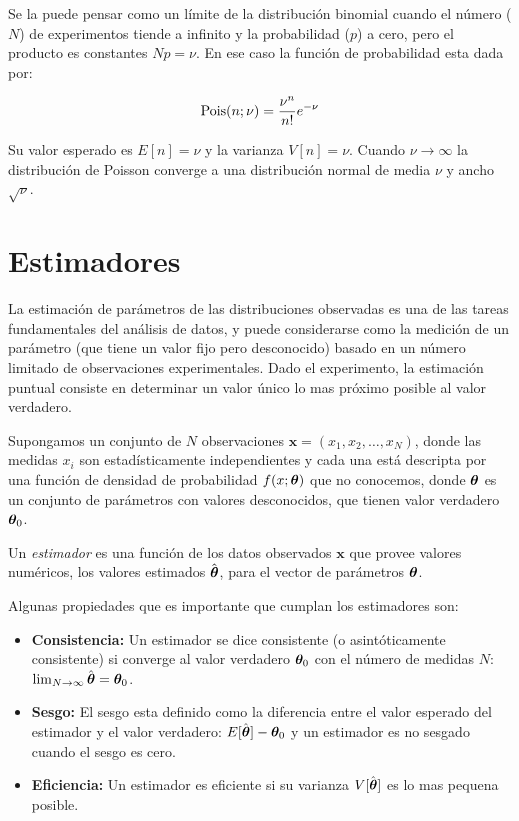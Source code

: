 Se la puede pensar como un límite de la distribución binomial cuando el número ($N$)
de experimentos tiende a infinito y la probabilidad ($p$) a cero, pero el producto es
constantes $Np = \nu$. En ese caso la función de probabilidad esta dada por:

\begin{equation}
  \operatorname{Pois}(n;\nu) = \frac{\nu^n}{n!} e^{-\nu}
\end{equation}

Su valor esperado es $E[n] = \nu$ y la varianza $V[n] = \nu$.
Cuando $\nu \to \infty$ la distribución de Poisson converge a una distribución
normal de media $\nu$ y ancho $\sqrt{\nu}$.


\section{Estimadores}

La estimación de parámetros de las distribuciones observadas es una de las
tareas fundamentales del análisis de datos, y puede considerarse como la
medición de un parámetro (que tiene un valor fijo pero desconocido) basado en un
número limitado de observaciones experimentales. Dado el experimento, la
estimación puntual consiste en determinar un valor único lo mas próximo posible al
valor verdadero.

Supongamos un conjunto de $N$ observaciones $\bm{x} = (x_1, x_2, \ldots, x_N)$,
donde las medidas $x_i$ son estadísticamente independientes y cada una está
descripta por una función de densidad de probabilidad $f(x;\bm{\theta})$ que no
conocemos, donde $\bm{\theta}$ es un conjunto de parámetros con valores
desconocidos, que tienen valor verdadero $\bm{\theta}_0$.

Un \emph{estimador} es una función de los datos observados $\bm{x}$ que provee
valores numéricos, los valores estimados $\hat{\bm{\theta}}$, para el vector de
parámetros $\bm{\theta}$.

Algunas propiedades que es importante que cumplan los estimadores son:

\begin{itemize}\itemsep0.2cm\parskip0.2cm
\item {\bf Consistencia:} Un estimador se dice consistente (o asintóticamente
  consistente) si converge al valor verdadero $\bm{\theta}_{0}$ con el número de
  medidas $N$: $\lim_{N \rightarrow \infty} \hat{\bm{\theta}} = \bm{\theta}_0$.

\item {\bf Sesgo:} El sesgo esta definido como la diferencia entre el valor
  esperado del estimador y el valor verdadero: $E[\hat{\bm{\theta}}] - \bm{\theta}_0$ y
  un estimador es no sesgado cuando el sesgo es cero.

\item {\bf Eficiencia:} Un estimador es eficiente si su varianza
  $V[\hat{\bm{\theta}}]$ es lo mas pequena posible.
\end{itemize}

